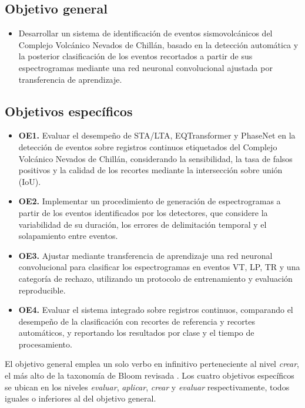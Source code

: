 \subsection{Objetivo general}

\begin{itemize}
    \item Desarrollar un sistema de identificación de eventos sismovolcánicos
    del Complejo Volcánico Nevados de Chillán, basado en la detección
    automática y la posterior clasificación de los eventos recortados a partir
    de sus espectrogramas mediante una red neuronal convolucional ajustada por
    transferencia de aprendizaje.
\end{itemize}

\subsection{Objetivos específicos}
\label{subsec:objetivos-especificos}

\begin{itemize}
    \item \textbf{OE1.} Evaluar el desempeño de STA/LTA, EQTransformer y
    PhaseNet en la detección de eventos sobre registros continuos etiquetados
    del Complejo Volcánico Nevados de Chillán, considerando la sensibilidad,
    la tasa de falsos positivos y la calidad de los recortes mediante la
    intersección sobre unión (IoU).
    \item \textbf{OE2.} Implementar un procedimiento de generación de
    espectrogramas a partir de los eventos identificados por los detectores,
    que considere la variabilidad de su duración, los errores de delimitación
    temporal y el solapamiento entre eventos.
    \item \textbf{OE3.} Ajustar mediante transferencia de aprendizaje una red
    neuronal convolucional para clasificar los espectrogramas en eventos VT,
    LP, TR y una categoría de rechazo, utilizando un protocolo de
    entrenamiento y evaluación reproducible.
    \item \textbf{OE4.} Evaluar el sistema integrado sobre registros
    continuos, comparando el desempeño de la clasificación con recortes de
    referencia y recortes automáticos, y reportando los resultados por clase
    y el tiempo de procesamiento.
\end{itemize}

El objetivo general emplea un solo verbo en infinitivo perteneciente al nivel
\emph{crear}, el más alto de la taxonomía de Bloom revisada
\parencite{anderson2001taxonomy}. Los cuatro objetivos específicos se ubican
en los niveles \emph{evaluar}, \emph{aplicar}, \emph{crear} y \emph{evaluar}
respectivamente, todos iguales o inferiores al del objetivo general.

